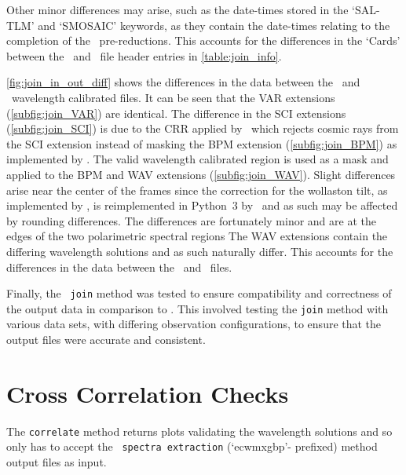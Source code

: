 Other minor differences may arise, such as the date-times stored in the `SAL-TLM' and `SMOSAIC' keywords, as they contain the date-times relating to the completion of the \polsalt\ pre-reductions.
This accounts for the differences in the `Cards' between the \polsalt\ and \stops\ file header entries in \autoref{table:join_info}.

\autoref{fig:join_in_out_diff} shows the differences in the data between the \polsalt\ and \stops\ wavelength calibrated files.
It can be seen that the \gls{VAR} extensions (\autoref{subfig:join_VAR}) are identical.
The difference in the \gls{SCI} extensions (\autoref{subfig:join_SCI}) is due to the \gls{CRR} applied by \stops\, which rejects cosmic rays from the \gls{SCI} extension instead of masking the \gls{BPM} extension (\autoref{subfig:join_BPM}) as implemented by \polsalt.
The valid wavelength calibrated region is used as a mask and applied to the \gls{BPM} and \gls{WAV} extensions (\autoref{subfig:join_WAV}).
Slight differences arise near the center of the frames since the correction for the wollaston tilt, as implemented by \polsalt, is reimplemented in Python~$3$ by \stops\ and as such may be affected by rounding differences.
The differences are fortunately minor and are at the edges of the two polarimetric spectral regions
The \gls{WAV} extensions contain the differing wavelength solutions and as such naturally differ.
This accounts for the differences in the data between the \polsalt\ and \stops\ files.

Finally, the \stops\ \texttt{join} method was tested to ensure compatibility and correctness of the output data in comparison to \polsalt.
This involved testing the \texttt{join} method with various data sets, with differing observation configurations, to ensure that the output files were accurate and consistent.

\section{Cross Correlation Checks} \label{subsec:test_corr}

The \texttt{correlate} method returns plots validating the wavelength solutions and so only has to accept the \polsalt\ \texttt{spectra extraction} (`ecwmxgbp'- prefixed) method output files as input.

